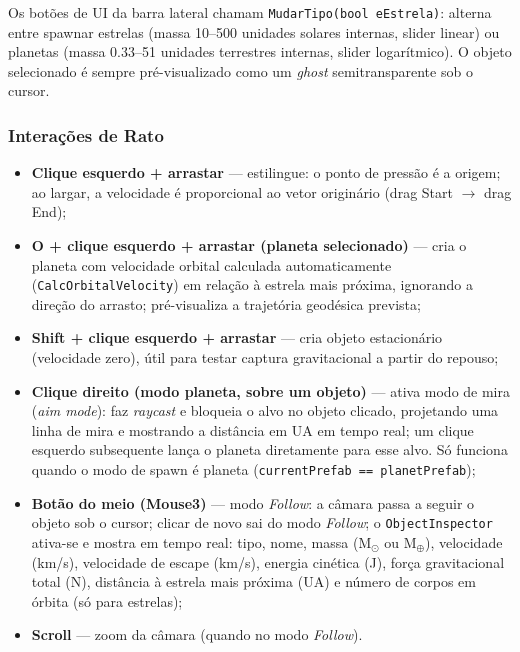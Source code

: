 \documentclass[12pt,a4paper]{article}
\begin{document}
Os bot\~{o}es de UI da barra lateral chamam \texttt{MudarTipo(bool eEstrela)}: alterna entre spawnar estrelas (massa 10--500 unidades solares internas, slider linear) ou planetas (massa 0.33--51 unidades terrestres internas, slider logar\'{i}tmico). O objeto selecionado \'{e} sempre pr\'{e}-visualizado como um \textit{ghost} semitransparente sob o cursor.

\subsubsection{Intera\c{c}\~{o}es de Rato}

\begin{itemize}
  \item \textbf{Clique esquerdo + arrastar} --- estilingue: o ponto de press\~{a}o \'{e} a origem; ao largar, a velocidade \'{e} proporcional ao vetor origin\'{a}rio (drag Start $\to$ drag End);
  \item \textbf{O + clique esquerdo + arrastar (planeta selecionado)} --- cria o planeta com velocidade orbital calculada automaticamente (\texttt{CalcOrbitalVelocity}) em rela\c{c}\~{a}o \`{a} estrela mais pr\'{o}xima, ignorando a dire\c{c}\~{a}o do arrasto; pr\'{e}-visualiza a trajet\'{o}ria geod\'{e}sica prevista;
  \item \textbf{Shift + clique esquerdo + arrastar} --- cria objeto estacion\'{a}rio (velocidade zero), \'{u}til para testar captura gravitacional a partir do repouso;
  \item \textbf{Clique direito (modo planeta, sobre um objeto)} --- ativa modo de mira (\textit{aim mode}): faz \textit{raycast} e bloqueia o alvo no objeto clicado, projetando uma linha de mira e mostrando a dist\^{a}ncia em UA em tempo real; um clique esquerdo subsequente lan\c{c}a o planeta diretamente para esse alvo. S\'{o} funciona quando o modo de spawn \'{e} planeta (\texttt{currentPrefab == planetPrefab});
  \item \textbf{Bot\~{a}o do meio (Mouse3)} --- modo \textit{Follow}: a c\^{a}mara passa a seguir o objeto sob o cursor; clicar de novo sai do modo \textit{Follow}; o \texttt{ObjectInspector} ativa-se e mostra em tempo real: tipo, nome, massa (M$_\odot$ ou M$_\oplus$), velocidade (km/s), velocidade de escape (km/s), energia cin\'{e}tica (J), for\c{c}a gravitacional total (N), dist\^{a}ncia \`{a} estrela mais pr\'{o}xima (UA) e n\'{u}mero de corpos em \'{o}rbita (s\'{o} para estrelas);
  \item \textbf{Scroll} --- zoom da c\^{a}mara (quando no modo \textit{Follow}).
\end{itemize}
\end{document}

